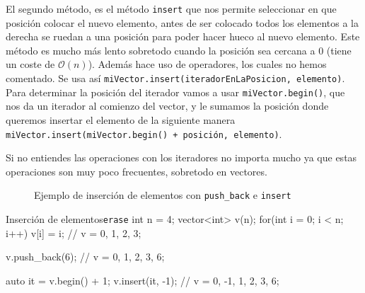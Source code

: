 \documentclass{article}
\begin{document}
    El segundo método, es el método \texttt{insert} que nos permite seleccionar en que posición colocar el
    nuevo elemento, antes de ser colocado todos los elementos a la derecha se ruedan a una posición para poder hacer hueco
    al nuevo elemento. Este método es mucho más lento sobretodo cuando la posición sea cercana a 0 (tiene un coste de $\mathcal{O}(n)$). 
    Además hace uso de operadores, los cuales no hemos comentado. Se usa así \texttt{miVector.insert(iteradorEnLaPosicion, elemento)}. 
    Para determinar la posición del iterador vamos a usar \texttt{miVector.begin()}, que nos da un iterador al comienzo del vector, 
    y le sumamos la posición donde queremos insertar el elemento de la siguiente manera \texttt{miVector.insert(miVector.begin() + posición, elemento)}.
    
    Si no entiendes las operaciones con los iteradores no importa mucho ya que estas operaciones son muy poco frecuentes, sobretodo en vectores.
    \begin{figure}[h]
        \centering
        \caption{Ejemplo de inserción de elementos con \texttt{push\_back} e \texttt{insert}}
    \end{figure}

    \begin{codelisting}{Inserción de elementos}\texttt{erase}
int n = 4;        
vector<int> v(n);
for(int i = 0; i < n; i++) {
    v[i] = i;
}
// v = {0, 1, 2, 3};

v.push_back(6); // v = {0, 1, 2, 3, 6};

auto it = v.begin() + 1;
v.insert(it, -1); // v = {0, -1, 1, 2, 3, 6};
        \end{codelisting}
\end{document}
